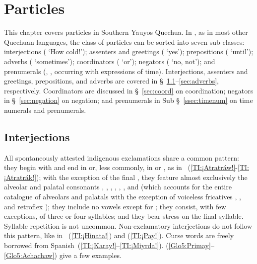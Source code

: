 \chapter{Particles}\label{ch:particles}
This chapter covers particles in Southern Yauyos Quechua. In \SYQ, as in most other Quechuan languages, the class of particles can be sorted into seven sub-classes: interjections ( ‘How cold!’); assenters and greetings ( ‘yes’); prepositions ( ‘until’); adverbs ( ‘sometimes’); coordinators ( ‘or’); negators ( ‘no, not’); and prenumerals (, , occurring with expressions of time). Interjections, assenters and greetings, prepositions, and adverbs are covered in §~\ref{sec:interjections}--\ref{sec:adverbs}, respectively. Coordinators are discussed in §~\ref{sec:coord} on coordination; negators in §~\ref{sec:negation} on negation; and prenumerals in Sub §~\ref{ssec:timenum} on time numerals and prenumerals.

\section{Interjections}\label{sec:interjections}
All spontaneously attested indigenous exclamations share a common pattern: they begin with  and end in  or, less commonly, in  or , as in ~(\ref{TI:¡Atratráw!}-\ref{TI:¡Atratrák!}); with the exception of the final , they feature almost exclusively the alveolar and palatal consonants , , , , , , and  (which accounts for the entire catalogue of \SYQ{} alveolars and palatals with the exception of voiceless fricatives , , and retroflex ); they include no vowels except for ; they consist, with few exceptions, of three or four syllables; and they bear stress on the final syllable. Syllable repetition is not uncommon. Non-exclamatory interjections do not follow this pattern, like in ~(\ref{TI:¡Hinata!}) and (\ref{TI:¡Pay!}). Curse words are freely borrowed from Spanish~(\ref{TI:¡Karay!}--\ref{TI:¡Miyrda!}). (\ref{Glo5:Primay}--\ref{Glo5:Achachaw}) give a few examples.\\


